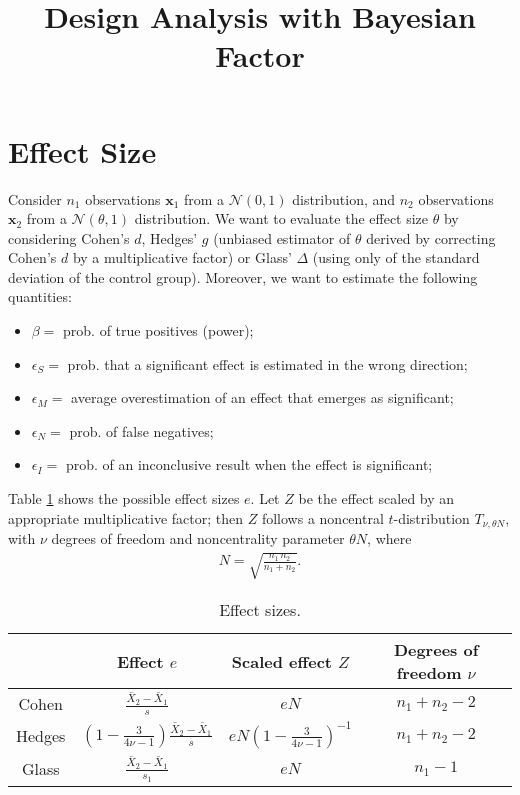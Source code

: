 \documentclass[11pt,a4paper,openright,twoside]{article}
\title{Design Analysis with Bayesian Factor}
\author{}
\date{}
\begin{document}
\maketitle







\section{Effect Size}
Consider $n_1$ observations $\mathbf{x}_1$ from a $\mathcal{N}(0,1)$ distribution, and $n_2$ observations $\mathbf{x}_2$ from a $\mathcal{N}(\theta,1)$ distribution. We want to evaluate the effect size $\theta$ by considering Cohen's $d$, Hedges' $g$ (unbiased estimator of $\theta$ derived by correcting Cohen's $d$ by a multiplicative factor) or Glass' $\Delta$ (using only of the standard deviation of the control group). Moreover, we want to estimate the following quantities:
\begin{itemize}
\item $\beta=$ prob. of true positives (power);
\item $\epsilon_S=$ prob. that a significant effect is estimated in the wrong direction;
\item $\epsilon_M=$ average overestimation of an effect that emerges as significant;
\item $\epsilon_N=$ prob. of false negatives;
\item $\epsilon_I=$ prob. of an inconclusive result when the effect is significant;
\end{itemize}

Table \ref{ee} shows the possible effect sizes $e$. Let $Z$ be the effect scaled by an appropriate multiplicative factor; then $Z$ follows a noncentral $t$-distribution $T_{\nu,\theta N}$, with $\nu$ degrees of freedom and noncentrality parameter $\theta N$, where
\begin{align*}
N=\sqrt{\frac{n_1\,n_2}{n_1+n_2}}.
\end{align*}

\begin{table}[h!]
\centering
\caption{Effect sizes.}
\label{ee}
\begin{tabular}{cccc}
\toprule
 & Effect $e$ & Scaled effect $Z$ & Degrees of freedom $\nu$\\
\midrule
Cohen & $\frac{\bar{X}_2-\bar{X}_1}{s}$ & $e N$ & $n_1+n_2-2$\\
Hedges & $\left(1-\frac{3}{4\nu-1}\right)\frac{\bar{X}_2-\bar{X}_1}{s}$ & $eN\left(1-\frac{3}{4\nu-1}\right)^{-1}$ & $n_1+n_2-2$\\
Glass & $\frac{\bar{X}_2-\bar{X}_1}{s_1}$ & $eN$ & $n_1-1$\\
\bottomrule
\end{tabular}
\end{table}
\end{document}
